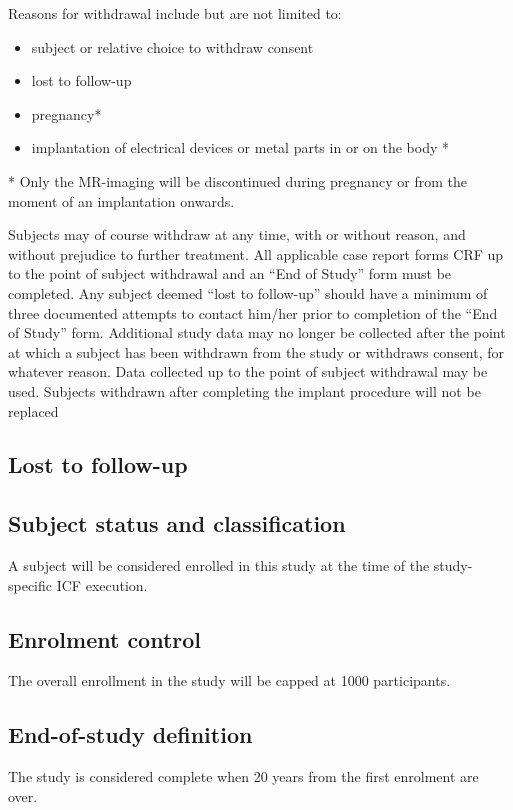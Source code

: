 Reasons for withdrawal include but are not limited to:
\begin{itemize}
  \item subject or relative choice to withdraw consent
  \item lost to follow-up
  \item pregnancy*
  \item implantation of electrical devices or metal parts in or on the body *
\end{itemize}

* Only the MR-imaging will be discontinued during pregnancy or from the moment of an implantation onwards.

Subjects may of course withdraw at any time, with or without reason, and without prejudice to further treatment. All applicable case report forms \ac{CRF} up to the point of subject withdrawal and an ``End of Study'' form must be completed. Any subject deemed ``lost to follow-up'' should have a minimum of three documented attempts to contact him/her prior to completion of the ``End of Study'' form. Additional study data may no longer be collected after the point at which a subject has been withdrawn from the study or withdraws consent, for whatever reason. Data collected up to the point of subject withdrawal may be used. Subjects withdrawn after completing the implant procedure will not be replaced 

\subsection{Lost to follow-up}
\subsection{Subject status and classification}
A subject will be considered enrolled in this study at the time of the study-specific \ac{ICF} execution.

\subsection{Enrolment control}
The overall enrollment in the study will be capped at 1000 participants.

\subsection{End-of-study definition}
The study is considered complete when 20 years from the first enrolment are over.

